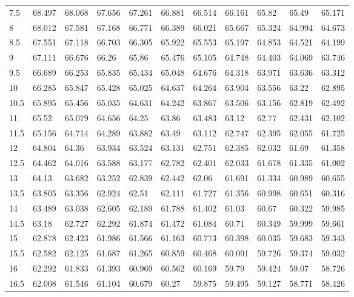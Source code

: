 \begin{bibunit}
\begin{table}[]
\begin{tabular}{lllllllllll}
			7.5  & 68.497 & 68.068 & 67.656 & 67.261 & 66.881 & 66.514 & 66.161 & 65.82  & 65.49  & 65.171 \\
			8    & 68.012 & 67.581 & 67.168 & 66.771 & 66.389 & 66.021 & 65.667 & 65.324 & 64.994 & 64.673 \\
			8.5  & 67.551 & 67.118 & 66.703 & 66.305 & 65.922 & 65.553 & 65.197 & 64.853 & 64.521 & 64.199 \\
			9    & 67.111 & 66.676 & 66.26  & 65.86  & 65.476 & 65.105 & 64.748 & 64.403 & 64.069 & 63.746 \\
			9.5  & 66.689 & 66.253 & 65.835 & 65.434 & 65.048 & 64.676 & 64.318 & 63.971 & 63.636 & 63.312 \\
			10   & 66.285 & 65.847 & 65.428 & 65.025 & 64.637 & 64.264 & 63.904 & 63.556 & 63.22  & 62.895 \\
			10.5 & 65.895 & 65.456 & 65.035 & 64.631 & 64.242 & 63.867 & 63.506 & 63.156 & 62.819 & 62.492 \\
			11   & 65.52  & 65.079 & 64.656 & 64.25  & 63.86  & 63.483 & 63.12  & 62.77  & 62.431 & 62.102 \\
			11.5 & 65.156 & 64.714 & 64.289 & 63.882 & 63.49  & 63.112 & 62.747 & 62.395 & 62.055 & 61.725 \\
			12   & 64.804 & 64.36  & 63.934 & 63.524 & 63.131 & 62.751 & 62.385 & 62.032 & 61.69  & 61.358 \\
			12.5 & 64.462 & 64.016 & 63.588 & 63.177 & 62.782 & 62.401 & 62.033 & 61.678 & 61.335 & 61.002 \\
			13   & 64.13  & 63.682 & 63.252 & 62.839 & 62.442 & 62.06  & 61.691 & 61.334 & 60.989 & 60.655 \\
			13.5 & 63.805 & 63.356 & 62.924 & 62.51  & 62.111 & 61.727 & 61.356 & 60.998 & 60.651 & 60.316 \\
			14   & 63.489 & 63.038 & 62.605 & 62.189 & 61.788 & 61.402 & 61.03  & 60.67  & 60.322 & 59.985 \\
			14.5 & 63.18  & 62.727 & 62.292 & 61.874 & 61.472 & 61.084 & 60.71  & 60.349 & 59.999 & 59.661 \\
			15   & 62.878 & 62.423 & 61.986 & 61.566 & 61.163 & 60.773 & 60.398 & 60.035 & 59.683 & 59.343 \\
			15.5 & 62.582 & 62.125 & 61.687 & 61.265 & 60.859 & 60.468 & 60.091 & 59.726 & 59.374 & 59.032 \\
			16   & 62.292 & 61.833 & 61.393 & 60.969 & 60.562 & 60.169 & 59.79  & 59.424 & 59.07  & 58.726 \\
			16.5 & 62.008 & 61.546 & 61.104 & 60.679 & 60.27  & 59.875 & 59.495 & 59.127 & 58.771 & 58.426 \\

\end{tabular}
\end{table}
\end{bibunit}
